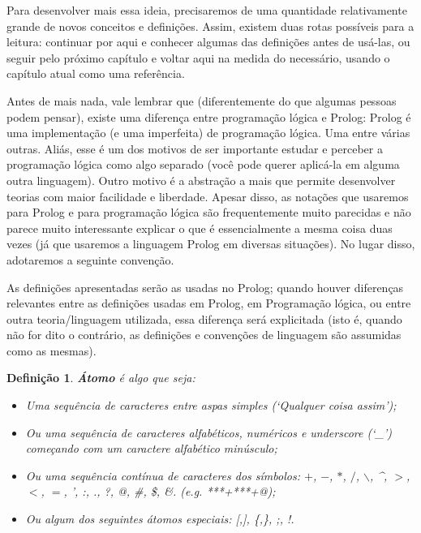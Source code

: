 \documentclass{article}
\newtheorem{definition}{Definição}[section]
\theoremstyle{remark}
\begin{document}
Para desenvolver mais essa ideia, precisaremos de uma quantidade relativamente grande de novos conceitos e definições. Assim, existem duas rotas possíveis para a leitura: continuar por aqui e conhecer algumas das definições antes de usá-las, ou seguir pelo próximo capítulo e voltar aqui na medida do necessário, usando o capítulo atual como uma referência.


Antes de mais nada, vale lembrar que (diferentemente do que algumas pessoas podem pensar),
existe uma diferença entre programação lógica e Prolog: Prolog é uma implementação (e uma imperfeita) de programação lógica.
Uma entre várias outras. Aliás, esse é um dos motivos de ser importante estudar e perceber a programação lógica como algo separado (você pode querer aplicá-la em alguma outra linguagem). Outro motivo é a abstração a mais que permite desenvolver teorias com maior facilidade e liberdade. Apesar
disso, as notações que usaremos para Prolog e para programação lógica são frequentemente muito parecidas e não parece muito interessante explicar o que é essencialmente a mesma coisa duas vezes (já que usaremos a linguagem Prolog em diversas situações). No lugar disso, adotaremos a seguinte convenção.

As definições apresentadas serão as usadas no Prolog; quando houver diferenças relevantes entre as definições usadas em Prolog, em Programação lógica, ou entre outra teoria/linguagem utilizada, essa diferença será explicitada (isto é, quando não for dito o contrário, as definições e convenções de linguagem são assumidas como as mesmas).


  \theoremstyle{definition}
  \begin{definition} \textbf{Átomo} é algo que seja:
    \begin{itemize}
      \item Uma sequência de caracteres entre aspas simples (\textit{`Qualquer coisa assim'});
      \item Ou uma sequência de caracteres alfabéticos, numéricos e \textit{underscore} (`\_') começando com um caractere alfabético minúsculo;
      \item Ou uma sequência contínua de caracteres dos símbolos: $+$, $-$, $*$, $/$, $\backslash$, \^{}, $>$, $<$, $=$, ', :, ., ?, @, \#, \$, \&. (e.g. ***+***+@);
      \item Ou algum dos seguintes átomos especiais: [,], \{,\}, ;, !.
    \end{itemize}
  \end{definition}
\end{document}
